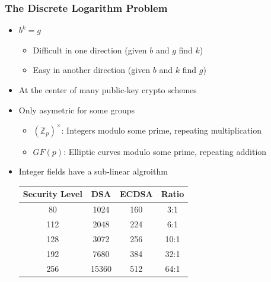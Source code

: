 \documentclass{beamer}
\begin{document}
\begin{frame}
  \frametitle{The Discrete Logarithm Problem}

  \begin{itemize}
  \item $b^k = g$
    \begin{itemize}
    \item Difficult in one direction (given $b$ and $g$ find $k$)
    \item Easy in another direction (given $b$ and $k$ find $g$)
    \end{itemize}
  \item At the center of many public-key crypto schemes
  \item Only asymetric for some groups
    \begin{itemize}
    \item $({\mathbb Z}_p)^\times$: Integers modulo some prime,
      repeating multiplication
    \item $GF(p)$: Elliptic curves modulo some prime, repeating
      addition
    \end{itemize}
  \item Integer fields have a sub-linear algroithm
    \begin{center}
      \begin{tabular}{cccc}
        Security Level & DSA & ECDSA & Ratio \\
        \hline
        80 & 1024 & 160 & 3:1 \\
        112 & 2048 & 224 & 6:1 \\
        128 & 3072 & 256 & 10:1 \\
        192 & 7680 & 384 & 32:1 \\
        256 & 15360 & 512 & 64:1 \\
      \end{tabular}
    \end{center}
  \end{itemize}
\end{frame}
\end{document}
